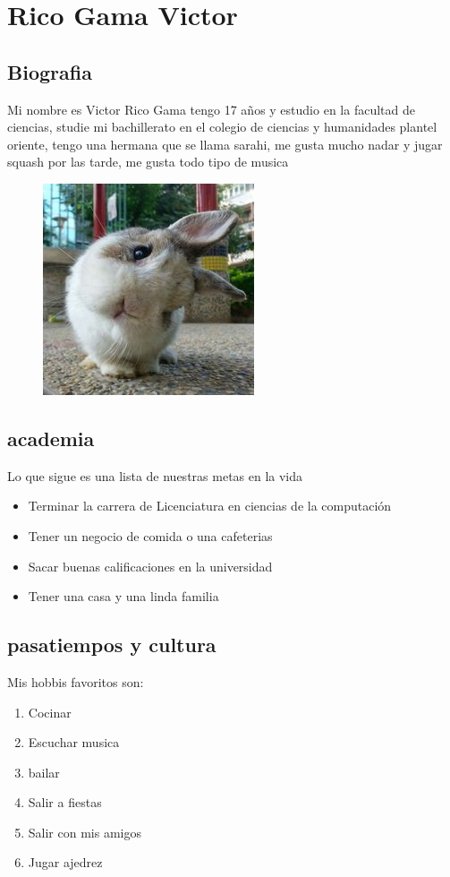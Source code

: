 \chapter{Rico Gama Victor}

\section{Biografia}
  Mi nombre es Victor Rico Gama tengo 17 años y estudio en la facultad de ciencias, studie mi bachillerato en el colegio de ciencias y humanidades plantel oriente, tengo una hermana que se llama sarahi, me gusta mucho nadar y jugar squash por las tarde, me gusta todo tipo de musica
  

\begin{figure}[h!]
  \centering
  \includegraphics[width=0.3 \textwidth]{conejito}

  
\end{figure}



\section{academia}
Lo que sigue es una lista de nuestras metas en la vida
\begin{itemize}
\item Terminar la carrera de Licenciatura en ciencias de la computación
\item Tener un negocio de comida o una cafeterias
\item Sacar buenas calificaciones en la universidad
\item Tener una casa y una linda familia
  
  
\end{itemize}

\section{pasatiempos y cultura}

Mis hobbis favoritos son:
\begin{enumerate}
\item Cocinar
\item Escuchar musica
\item bailar
\item Salir a fiestas
\item Salir con mis amigos
  \item Jugar ajedrez
  
\end{enumerate}
